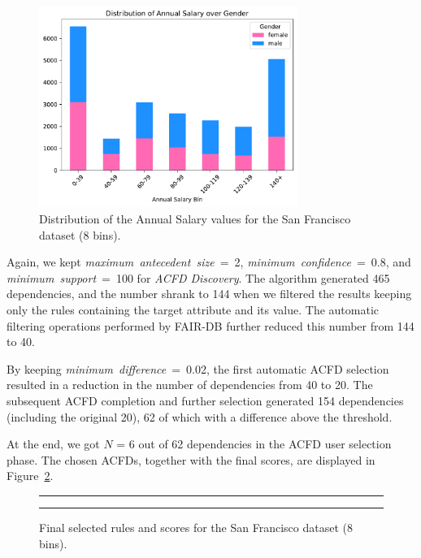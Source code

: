 \begin{itemize}
\begin{figure}[t!]
\centering
\includegraphics[width=0.75\textwidth]{figures/san_francisco_annual_salary_over_gender.pdf}
\caption{Distribution of the \textrm{Annual Salary} values for the San Francisco dataset (8 bins).}
\label{fig:san_francisco_8bins_fair-db1}
\end{figure}

Again, we kept \textit{maximum~antecedent~size}~=~2, \textit{minimum~confidence}~=~0.8, and \textit{minimum~support}~=~100 for \textit{ACFD Discovery}. The algorithm generated 465 dependencies, and the number shrank to 144 when we filtered the results keeping only the rules containing the target attribute and its value. The automatic filtering operations performed by FAIR-DB further reduced this number from 144 to 40.

By keeping \textit{minimum~difference}~=~0.02, the first automatic ACFD selection resulted in a reduction in the number of dependencies from 40 to 20. The subsequent ACFD completion and further selection generated 154 dependencies (including the original 20), 62 of which with a difference above the threshold.

At the end, we got \(N\) = 6 out of 62 dependencies in the ACFD user selection phase. The chosen ACFDs, together with the final scores, are displayed in Figure~\ref{fig:san_francisco_8bins_fair-db2}.

\begin{figure}[t!]
\centering
\noindent\rule{\linewidth}{0.4pt}\par
\noindent\rule{\linewidth}{0.4pt}
\caption{Final selected rules and scores for the San Francisco dataset (8 bins).}
\label{fig:san_francisco_8bins_fair-db2}
\end{figure}


\end{itemize}

